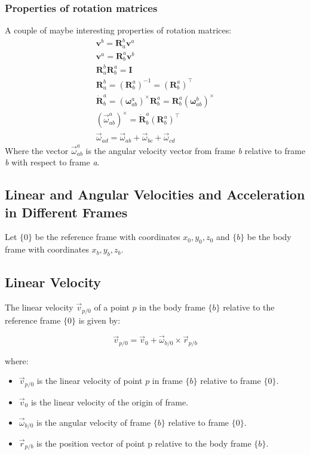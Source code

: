 \subsubsection{Properties of rotation matrices}
A couple of maybe interesting properties of rotation matrices:
\begin{subequations}
    \begin{align}
        \mathbf{v}^b=\mathbf{R}_a^b\mathbf{v}^a \\
        \mathbf{v}^a=\mathbf{R}_b^a\mathbf{v}^b \\
        \mathbf{R}_a^b\mathbf{R}_b^a = \mathbf{I} \\
        \mathbf{R}_a^b = \left(\mathbf{R}_b^a\right)^{-1} = \left(\mathbf{R}_b^a\right)^\top \\
        \dot{\mathbf{R}}_b^a = \left(\mathbf{\omega}_{ab}^a\right)^\times\mathbf{R}_b^a = \mathbf{R}_b^a\left(\mathbf{\omega}_{ab}^b\right)^\times \\
        \left(\vec{\omega}_{ab}^a\right)^\times = \dot{\mathbf{R}}_b^a\left(\mathbf{R}_b^a\right)^\top \\
        \vec{\omega}_{ad} = \vec{\omega}_{ab} + \vec{\omega}_{bc} + \vec{\omega}_{cd}
    \end{align}
\end{subequations}
Where the vector $\vec{\omega}_{ab}^a$ is the angular velocity vector from frame \textit{b} relative to frame \textit{b} with respect to frame \textit{a}.

\subsection{Linear and Angular Velocities and Acceleration in Different Frames}

Let \( \{0\} \) be the reference frame with coordinates \( x_0, y_0, z_0 \) and \( \{b\} \) be the body frame with coordinates \( x_b, y_b, z_b \). 

\subsection{Linear Velocity}

The linear velocity \( \vec{v}_{p/0} \) of a point \( p \) in the body frame \( \{b\} \) relative to the reference frame \( \{0\} \) is given by:

\[
\vec{v}_{p/0} = \vec{v}_0 + \vec{\omega}_{b/0} \times \vec{r}_{p/b}
\]

where:
\begin{itemize}
    \item \( \vec{v}_{p/0} \) is the linear velocity of point \( p \) in frame \( \{b\} \) relative to frame \( \{0\} \).
    \item \( \vec{v}_0 \) is the linear velocity of the origin of frame.
    \item \( \vec{\omega}_{b/0} \) is the angular velocity of frame \( \{b\} \) relative to frame \( \{0\} \).
    \item \( \vec{r}_{p/b} \) is the position vector of point p relative to the body frame \( \{b\} \).
\end{itemize}

